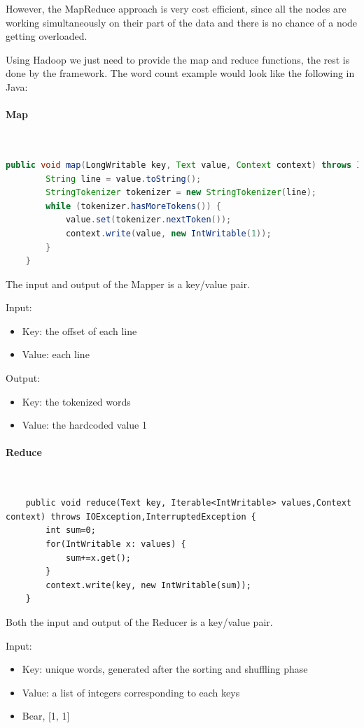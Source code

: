 However, the MapReduce approach is very cost efficient, since all the nodes are working simultaneously on their part of the data and there is no chance of a node getting overloaded.

Using Hadoop we just need to provide the map and reduce functions, the rest is done by the framework.  The word count example would look like the following in Java:
\paragraph{Map}\mbox{}\\
\begin{lstlisting}[language=Java]
	public void map(LongWritable key, Text value, Context context) throws IOException,InterruptedException {
		String line = value.toString();
		StringTokenizer tokenizer = new StringTokenizer(line);
		while (tokenizer.hasMoreTokens()) {
			value.set(tokenizer.nextToken());
			context.write(value, new IntWritable(1));
		}
	}
\end{lstlisting}
The input and output of the Mapper is a key/value pair. 

Input:
\begin{itemize}
	\item Key: the offset of each line
	\item Value: each line
\end{itemize}

Output:
\begin{itemize}
	\item Key: the tokenized words
	\item Value: the hardcoded value 1
\end{itemize}

\paragraph{Reduce}\mbox{}\\
\begin{lstlisting}
	public void reduce(Text key, Iterable<IntWritable> values,Context context) throws IOException,InterruptedException {
		int sum=0;
		for(IntWritable x: values) {
			sum+=x.get();
		}
		context.write(key, new IntWritable(sum));
	}
\end{lstlisting}
Both the input and output of the Reducer is a key/value pair. 

Input:
\begin{itemize}
	\item Key: unique words, generated after the sorting and shuffling phase
	\item Value: a list of integers corresponding to each keys
	\item \eg Bear, [1, 1]
\end{itemize}

